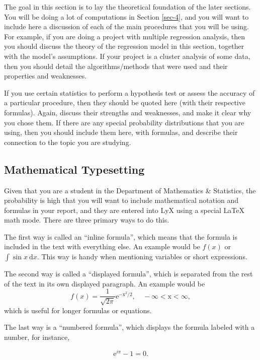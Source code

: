 \documentclass[11pt]{article}
\begin{document}
The goal in this section is to lay the theoretical foundation of the
later sections. You will be doing a lot of computations in Section
\ref{sec-4}, and you will want to include here a discussion of each
of the main procedures that you will be using.  For example, if you
are doing a project with multiple regression analysis, then you should
discuss the theory of the regression model in this section, together
with the model's assumptions. If your project is a cluster analysis of
some data, then you should detail the algorithms/methods that were
used and their properties and weaknesses.

If you use certain statistics to perform a hypothesis test or assess
the accuracy of a particular procedure, then they should be quoted
here (with their respective formulas). Again, discuss their strengths
and weaknesses, and make it clear why you chose them. If there are any
special probability distributions that you are using, then you should
include them here, with formulas, and describe their connection to the
topic you are studying.

\subsection[Mathematical Typesetting]{Mathematical Typesetting}
\label{sec-3-1}

Given that you are a student in the Department of Mathematics \&
Statistics, the probability is high that you will want to include
mathematical notation and formulas in your report, and they are
entered into LyX using a special \LaTeX{} math mode. There are three
primary ways to do this.

The first way is called an “inline formula”, which means that the
formula is included in the text with everything else. An example would
be \(f(x)\) or \( \int\sin x\ \mathrm{d}x \). This way is handy when
mentioning variables or short expressions.

The second way is called a “displayed formula”, which is separated
from the rest of the text in its own displayed paragraph. An example
would be
\[
f(x)=\frac{1}{\sqrt{2\pi}}\mathrm{e^{-x^{2}/2},\quad-\infty<x<\infty},
\]
which is useful for longer formulas or equations. 

The last way is a ``numbered formula'', which displays the formula
labeled with a number, for instance,

\begin{equation}
\mathrm{e}^{i\pi}-1=0.
\end{equation}
\end{document}
